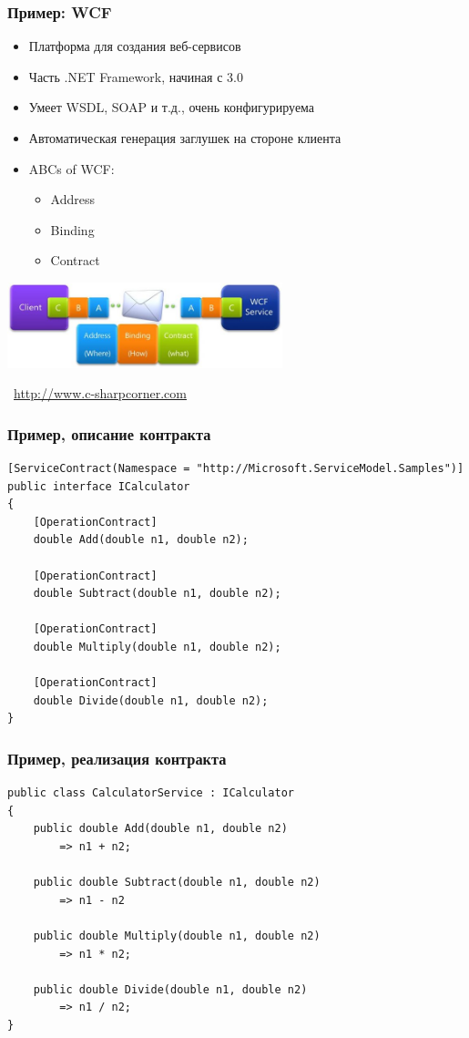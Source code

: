 \documentclass[xetex,mathserif,serif]{beamer}
\newcommand{\attribution}[1] {
	\vspace{-5mm}\begin{flushright}\begin{scriptsize}\textcolor{gray}{\textcopyright\, #1}\end{scriptsize}\end{flushright}
}
\begin{document}
	\begin{frame}
		\frametitle{Пример: WCF}
		\begin{itemize}
			\item Платформа для создания веб-сервисов
			\item Часть .NET Framework, начиная с 3.0
			\item Умеет WSDL, SOAP и т.д., очень конфигурируема
			\item Автоматическая генерация заглушек на стороне клиента
			\item ABCs of WCF:
			\begin{itemize}
				\item Address
				\item Binding
				\item Contract
			\end{itemize}
		\end{itemize}
		\begin{center}
			\includegraphics[width=0.6\textwidth]{wcf.png}
			\attribution{\url{http://www.c-sharpcorner.com}}
		\end{center}
	\end{frame}

	\begin{frame}[fragile]
		\frametitle{Пример, описание контракта}
		\begin{small}
			\begin{verbatim}
[ServiceContract(Namespace = "http://Microsoft.ServiceModel.Samples")]  
public interface ICalculator  
{
    [OperationContract]
    double Add(double n1, double n2);

    [OperationContract]
    double Subtract(double n1, double n2);

    [OperationContract]
    double Multiply(double n1, double n2);

    [OperationContract]
    double Divide(double n1, double n2);
}
			\end{verbatim}
		\end{small}
	\end{frame}

	\begin{frame}[fragile]
		\frametitle{Пример, реализация контракта}
		\begin{small}
			\begin{verbatim}
public class CalculatorService : ICalculator  
{
    public double Add(double n1, double n2)
        => n1 + n2;  

    public double Subtract(double n1, double n2)
        => n1 - n2

    public double Multiply(double n1, double n2)  
        => n1 * n2;

    public double Divide(double n1, double n2)  
        => n1 / n2;
}
			\end{verbatim}
		\end{small}
	\end{frame}
\end{document}
